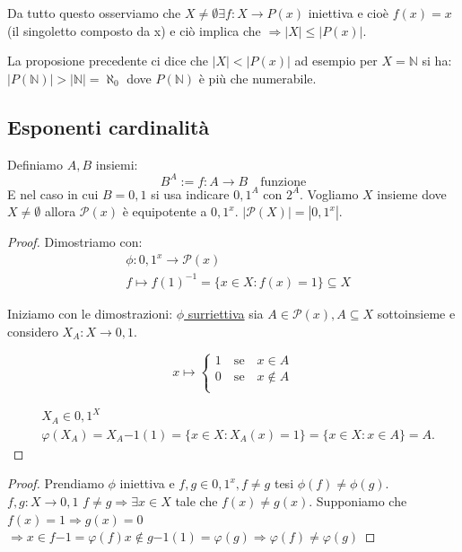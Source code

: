 \documentclass{article}
\theoremstyle{definition}
\begin{document}
Da tutto questo osserviamo che $X \not = \emptyset \exists f : X \to P(x)$ iniettiva e cioè $f(x) = {x}$ (il singoletto composto da x) e ciò implica che $\Rightarrow |X| \le |P(x)|$. 

La proposione precedente ci dice che $|X| < |P(x)|$ ad esempio per $X = \mathbb{N}$ si ha: \newline
$|P(\mathbb{N})| > |\mathbb{N}| = \aleph_0 $ dove $P(\mathbb{N})$ è più che numerabile.



\subsection{Esponenti cardinalità}\label{sec:a_a}
Definiamo $A,B$ insiemi:
\begin{equation*}
        B^A := {f:A \to B \quad \mbox{funzione}}
\end{equation*}
E nel caso in cui $B = {0,1}$ si usa indicare ${0,1}^A$ con $2^A$.
Vogliamo $X$ insieme dove $X \not = \emptyset$ allora $\mathcal{P}(x)$ è equipotente a ${0,1}^x$. \newline
$|\mathcal{P}(X)| = |{0,1}^x|$.

\begin{tcolorbox}
\begin{proof}
Dimostriamo con:
\begin{align*}
        & \phi : {0,1}^x \to \mathcal{P}(x) \\
        & f \mapsto {f(1)}^{-1} = \{x \in X : f(x) = 1\} \subseteq X
\end{align*}

Iniziamo con le dimostrazioni:
\underline{$\phi$ surriettiva} sia $A \in \mathcal{P}(x), A \subseteq X$ sottoinsieme e considero $X_A : X \to {0,1}$.

\[x \mapsto  
\begin{cases}
        1 \quad \mbox{se} \quad x \in A \\
        0 \quad \mbox{se} \quad x \not \in A \\
\end{cases}
\]

\begin{align*}
& X_A \in {0,1}^X \\
& \varphi(X_A) = {X_A}{-1}(1) = \{x \in X : X_A(x) = 1\} = \{x \in X : x \in A\} = A.
\end{align*}
\end{proof}  
\end{tcolorbox}

\begin{tcolorbox}
\begin{proof}
Prendiamo $\phi$ iniettiva e $f,g \in {0,1}^x, f \not = g$ tesi $\phi(f) \not = \phi(g)$.
$f,g : X \to {0,1}$ \newline
$f \not = g \Rightarrow \exists x \in X$ tale che $f(x) \not = g(x)$.
Supponiamo che $f(x) = 1 \Rightarrow g(x) = 0$ \newline
$\Rightarrow x \in {f}{-1} = \varphi(f) x \not \in {g}{-1}(1) = \varphi(g) \Rightarrow \varphi(f) \not = \varphi(g)$
\end{proof}
\end{tcolorbox}
\end{document}
